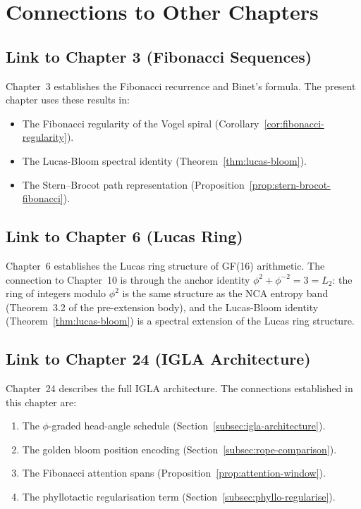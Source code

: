 \section{Connections to Other Chapters}
\label{sec:connections}

\subsection{Link to Chapter 3 (Fibonacci Sequences)}
\label{subsec:link-ch3}

Chapter~3 establishes the Fibonacci recurrence and Binet's formula.
The present chapter uses these results in:
\begin{itemize}
  \item The Fibonacci regularity of the Vogel spiral
        (Corollary~\ref{cor:fibonacci-regularity}).
  \item The Lucas-Bloom spectral identity
        (Theorem~\ref{thm:lucas-bloom}).
  \item The Stern--Brocot path representation
        (Proposition~\ref{prop:stern-brocot-fibonacci}).
\end{itemize}

\subsection{Link to Chapter 6 (Lucas Ring)}
\label{subsec:link-ch6}

Chapter~6 establishes the Lucas ring structure of GF(16) arithmetic.
The connection to Chapter~10 is through the anchor identity
$\phi^2 + \phi^{-2} = 3 = L_2$: the ring of integers modulo $\phi^2$
is the same structure as the NCA entropy band (Theorem~3.2 of the
pre-extension body), and the Lucas-Bloom identity
(Theorem~\ref{thm:lucas-bloom}) is a spectral extension of the Lucas
ring structure.

\subsection{Link to Chapter 24 (IGLA Architecture)}
\label{subsec:link-ch24}

Chapter~24 describes the full IGLA architecture.  The connections
established in this chapter are:
\begin{enumerate}
  \item The $\phi$-graded head-angle schedule
        (Section~\ref{subsec:igla-architecture}).
  \item The golden bloom position encoding
        (Section~\ref{subsec:rope-comparison}).
  \item The Fibonacci attention spans
        (Proposition~\ref{prop:attention-window}).
  \item The phyllotactic regularisation term
        (Section~\ref{subsec:phyllo-regularise}).
\end{enumerate}

